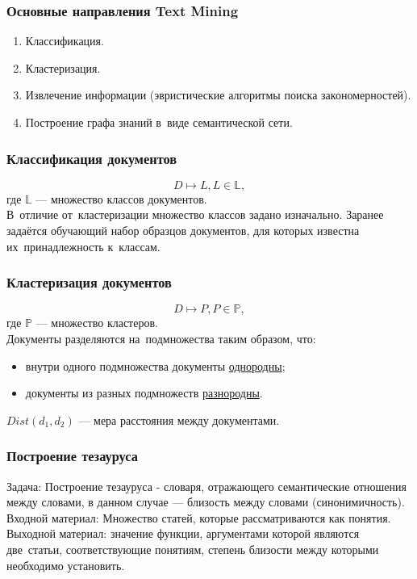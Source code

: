 \documentclass{beamer}
\begin{document}
\begin{frame}
\frametitle{Основные направления Text Mining}
\begin{enumerate}
\item{Классификация.}
\item{Кластеризация.}
\item{Извлечение информации (эвристические алгоритмы поиска закономерностей).}
\item{Построение графа знаний в~виде семантической сети.}

\end{enumerate}
\end{frame}

\begin{frame}
\frametitle{Классификация документов}
$$D \mapsto L, L \in \mathbb{L},$$
\vspace{1cm}
где $\mathbb{L}$ --- множество классов документов.\\
\vspace{1cm}
В~отличие от~кластеризации множество классов задано изначально.
\vspace{1cm}
Заранее задаётся обучающий набор образцов документов, для которых известна их~принадлежность к~классам.
\end{frame}

\begin{frame}
\frametitle{Кластеризация документов}
$$D \mapsto P, P \in \mathbb{P},$$
\vspace{1cm}
где $\mathbb{P}$ --- множество кластеров.\\
\vspace{1cm}
Документы разделяются на~подмножества таким образом, что:

\begin{itemize}
\item{внутри одного подмножества документы \underline{однородны};}
\item{документы из разных подмножеств \underline{разнородны}.}
\end{itemize}
\vspace{1cm}
$Dist(d_{1},d_{2})$ --- мера расстояния между документами.
\end{frame}

\begin {frame}
\frametitle{Построение тезауруса}
Задача: Построение тезауруса - словаря, отражающего семантические отношения
между словами, в данном случае --- близость между словами (синонимичность).\\
\vspace{1cm}
Входной материал: Множество статей, которые рассматриваются как понятия.\\
\vspace{1cm}
Выходной материал: значение функции, аргументами которой являются две~статьи, 
соответствующие понятиям, степень близости между которыми необходимо установить.
\end{frame}
\end{document}
